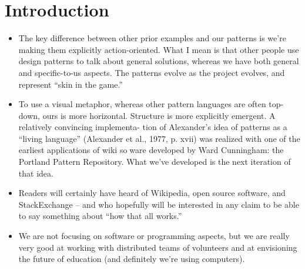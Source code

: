 \section{Introduction}

\begin{itemize}
\item The key difference between other prior examples and our
patterns is we're making them explicitly action-oriented.  What I mean
is that other people use design patterns to talk about general
solutions, whereas we have both general and specific-to-us aspects.
The patterns evolve as the project evolves, and represent ``skin in the game.''
\item To use a visual metaphor, whereas other pattern languages are often top-down,
ours is more horizontal.  Structure is more explicitly emergent.  A relatively convincing implementa-
tion of Alexander’s idea of patterns as a “living language” (Alexander et al., 1977, p. xvii)
was realized with one of the earliest applications of wiki soware developed by Ward
Cunningham: the Portland Pattern Repository.  What we've developed is the next iteration of that idea.
\item Readers will certainly have heard of Wikipedia, open source
software, and StackExchange -- and who hopefully will be interested in
any claim to be able to say something about ``how that all works.''
\item We are not focusing on software or programming aspects, but we
are really very good at working with distributed teams of volunteers and
at envisioning the future of education (and definitely we're using
computers).
\end{itemize}